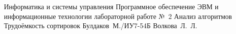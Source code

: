 \documentclass{bmstu}[a4paper]
\begin{document}
\makereporttitle
{Информатика и системы управления} %
{Программное обеспечение ЭВМ и информационные технологии} %
{лабораторной работе №~2} %
{Анализ алгоритмов} %
{Трудоёмкость сортировок} %
{} %
{Булдаков~М./ИУ7-54Б} %
{Волкова~Л.~Л.} %

\maketableofcontents









\makebibliography


\end{document}
